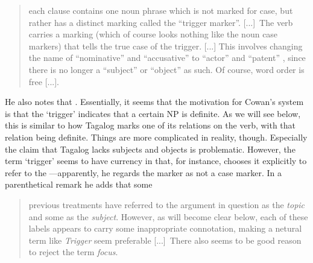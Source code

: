 \blockcquote{cowan1995}{each clause contains one noun phrase which is not
marked for case, but rather has a distinct marking called the \enquote{trigger
marker}. [...]\ The verb carries a marking (which of course looks nothing like
the noun case markers) that tells the true case of the trigger.
% 
%
[...]
%
This involves changing the name of \enquote{nominative} and
\enquote{accusative} to \enquote{actor} and \enquote{patent} \sic{}, since
there is no longer a \enquote{subject} or \enquote{object} as such. Of course,
word order is free [...].
% 
}

He also notes that . Essentially, it seems that the motivation for
Cowan's system is that the `trigger' indicates that a certain NP is definite.
As we will see below, this is similar to how Tagalog marks one of its relations
on the verb, with that relation being definite. Things are more complicated in
reality, though. Especially the claim that Tagalog lacks subjects and objects
is problematic. However, the term `trigger' seems to have currency in that, for
instance, \citet{schachter2015} chooses it explicitly to refer to the
---apparently, he
regards the  marker as not a case marker. In a parenthetical remark he
adds that some

\blockcquote[1659]{schachter2015}{previous treatments have referred to the
argument in question as the \emph{topic} and some as the \emph{subject}.
However, as will become clear below, each of these labels appears to carry some
inappropriate connotation, making a netural term like \emph{Trigger} seem
preferable [...]\ There also seems to be good reason to reject the term
\emph{focus}.}

